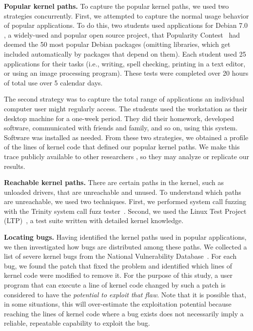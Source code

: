 \noindent
\textbf{Popular kernel paths.}
To capture the popular kernel paths, we used two strategies concurrently.
First, we attempted to capture the normal usage behavior of popular applications.
To do this, two students used applications for Debian 7.0 , a widely-used and popular open source project,
that Popularity Contest~\cite{Top-Packages} had deemed the 50 most popular Debian
packages (omitting libraries, which get included automatically by packages that depend on them).
Each student used 25 applications for their
tasks (i.e., writing, spell checking, printing in a text editor, or using
an image processing program).
These tests were completed over 20 hours of
total use over 5 calendar days.

The second strategy was to capture the total range of applications an
individual computer user might regularly access. The students used the workstation as their
desktop machine for a one-week period. They did their homework, developed
software, communicated with friends and family, and so on, using this
system.  Software was installed as needed.
%
From these two strategies, we obtained a profile of the lines of
kernel code that defined our popular kernel paths.  We make this trace
publicly available to other researchers \redact, so they may analyze or
replicate our results.

\noindent
\textbf{Reachable kernel paths.}
There are certain paths in the kernel, such as unloaded drivers, that are
unreachable and unused.
To understand which paths are unreachable, we used two techniques.  First,
we performed system call fuzzing with the Trinity
system call fuzz tester~\cite{Trinity}.
Second, we used the Linux Test Project (LTP)~\cite{LTP}, a test suite written
with detailed kernel knowledge.
%

\noindent
\textbf{Locating bugs.}
Having identified the kernel paths used in popular applications,
we then investigated how bugs are distributed among these paths. We collected a list of
severe kernel bugs from the National Vulnerability Database~\cite{NVD}.
For each bug, we found the patch that fixed the problem and identified
which lines of kernel code were modified to remove it.
For the purpose of this study, a user program that can execute a line of kernel
code changed by such a patch is considered to have the \textit{potential to
exploit that flaw}.  Note that it is possible that, in some situations,
this will over-estimate the exploitation potential because reaching the lines of kernel code where a
bug exists does not necessarily imply a reliable, repeatable capability to
exploit the bug.

